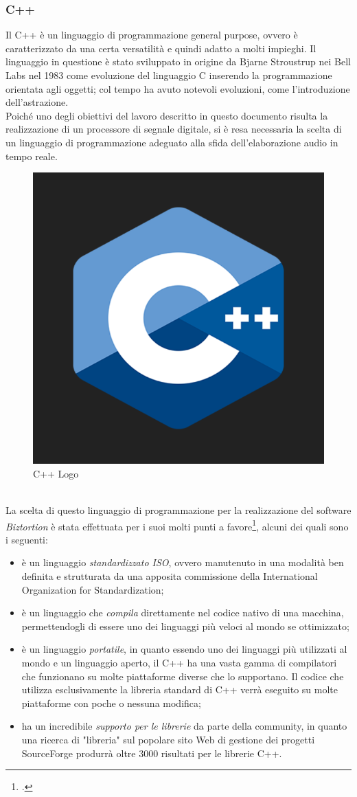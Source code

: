 \subsubsection*{C++}
Il C++ è un linguaggio di programmazione general purpose, ovvero è caratterizzato da una certa versatilità e  quindi adatto a molti impieghi. Il linguaggio in questione è stato sviluppato in origine da Bjarne Stroustrup nei Bell Labs nel 1983 come evoluzione del linguaggio C inserendo la programmazione orientata agli oggetti; col tempo ha avuto notevoli evoluzioni, come l'introduzione dell'astrazione. \\
Poiché uno degli obiettivi del lavoro descritto in questo documento risulta la realizzazione di un processore di segnale digitale, si è resa necessaria la scelta di un linguaggio di programmazione adeguato alla sfida dell'elaborazione audio in tempo reale.
\begin{figure}[h!] 
    \centering 
    \includegraphics[width=0.5\columnwidth]{immagini/cap3/c++.png}
    \caption{C++ Logo}
\end{figure} \\
La scelta di questo linguaggio di programmazione per la realizzazione del software \textit{Biztortion} è stata effettuata per i suoi molti punti a favore\footcite{site:cplusplus}, alcuni dei quali sono i seguenti:
\begin{itemize}
    \item è un linguaggio \textit{standardizzato ISO}, ovvero manutenuto in una modalità ben definita e strutturata da una apposita commissione della International Organization for Standardization;
    \item è un linguaggio che \textit{compila} direttamente nel codice nativo di una macchina, permettendogli di essere uno dei linguaggi più veloci al mondo se ottimizzato;
    \item è un linguaggio \textit{portatile}, in quanto essendo uno dei linguaggi più utilizzati al mondo e un linguaggio aperto, il C++ ha una vasta gamma di compilatori che funzionano su molte piattaforme diverse che lo supportano. Il codice che utilizza esclusivamente la libreria standard di C++ verrà eseguito su molte piattaforme con poche o nessuna modifica;
    \item ha un incredibile \textit{supporto per le librerie} da parte della community, in quanto una ricerca di "libreria" sul popolare sito Web di gestione dei progetti SourceForge produrrà oltre 3000 risultati per le librerie C++.
\end{itemize}


